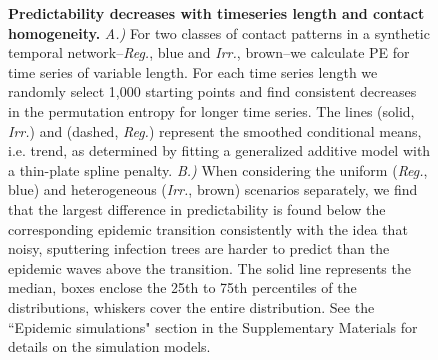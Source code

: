 \documentclass[fleqn,12pt]{wlscirep}
\begin{document}
\begin{figure}[H]
	\centering
	\caption{\label{fig:simnets}\textbf{Predictability decreases with timeseries length and contact homogeneity.} 
		\textit{A.)} For two classes of contact patterns in a synthetic temporal network--\textit{Reg.}, blue and \textit{Irr.}, brown--we calculate PE for time series of variable length. For each time series length we randomly select 1,000 starting points and find consistent decreases in the permutation entropy for longer time series. The lines (solid, \textit{Irr.}) and (dashed, \textit{Reg.}) represent the smoothed conditional means, i.e. trend, as determined by fitting a generalized additive model with a thin-plate spline penalty. \textit{B.)} When considering the uniform (\textit{Reg.}, blue) and heterogeneous (\textit{Irr.}, brown) scenarios separately, we find that the largest difference in predictability is found below the corresponding epidemic transition consistently with the idea that noisy, sputtering infection trees are harder to predict than the epidemic waves above the transition. The solid line represents the median, boxes enclose the 25th to 75th percentiles of the distributions, whiskers cover the entire distribution. See the ``Epidemic simulations" section in the Supplementary Materials for details on the simulation models.}
\end{figure} 




\end{document}
